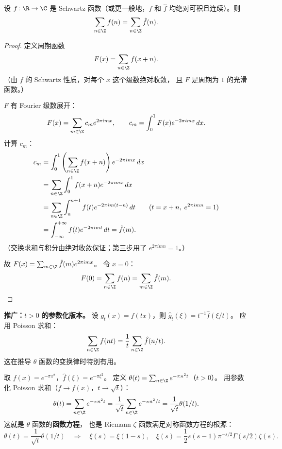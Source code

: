 \begin{theorem}
\label{thm:poisson-summation}
设 $f\colon \R \to \C$ 是 Schwartz 函数（或更一般地，$f$ 和 $\hat{f}$ 均绝对可积且连续）。则
\[
  \sum_{n \in \Z} f(n) = \sum_{n \in \Z} \hat{f}(n).
\]
\end{theorem}



\begin{proof}
定义周期函数
\[
  F(x) = \sum_{n \in \Z} f(x + n).
\]
（由 $f$ 的 Schwartz 性质，对每个 $x$ 这个级数绝对收敛，
且 $F$ 是周期为 $1$ 的光滑函数。）

$F$ 有 Fourier 级数展开：
\[
  F(x) = \sum_{m \in \Z} c_m e^{2\pi i mx},
  \qquad c_m = \int_0^1 F(x) e^{-2\pi imx}\, dx.
\]
计算 $c_m$：
\begin{align}
  c_m
  &= \int_0^1 \left(\sum_{n \in \Z} f(x+n)\right) e^{-2\pi imx}\, dx \\
  &= \sum_{n \in \Z} \int_0^1 f(x+n) e^{-2\pi imx}\, dx \\
  &= \sum_{n \in \Z} \int_n^{n+1} f(t) e^{-2\pi im(t-n)}\, dt
    \qquad (t = x + n,\; e^{2\pi imn} = 1) \\
  &= \int_{-\infty}^{+\infty} f(t) e^{-2\pi imt}\, dt = \hat{f}(m).
\end{align}
（交换求和与积分由绝对收敛保证；第三步用了 $e^{2\pi imn} = 1$。）

故 $F(x) = \sum_{m \in \Z} \hat{f}(m) e^{2\pi imx}$。
令 $x = 0$：
\[
  F(0) = \sum_{n \in \Z} f(n) = \sum_{m \in \Z} \hat{f}(m). \qedhere
\]
\end{proof}

\textbf{推广：$t > 0$ 的参数化版本。}
设 $g_t(x) = f(tx)$，则 $\hat{g}_t(\xi) = t^{-1}\hat{f}(\xi/t)$。
应用 Poisson 求和：
\[
  \sum_{n \in \Z} f(nt) = \frac{1}{t} \sum_{n \in \Z} \hat{f}(n/t).
\]
这在推导 $\theta$ 函数的变换律时特别有用。

\begin{example}
\label{ex:theta-poisson}
取 $f(x) = e^{-\pi x^2}$，$\hat{f}(\xi) = e^{-\pi\xi^2}$。
定义 $\theta(t) = \sum_{n \in \Z} e^{-\pi n^2 t}$（$t > 0$）。
用参数化 Poisson 求和（$f \to f(x)$，$t \to \sqrt{t}$）：
\[
  \theta(t) = \sum_{n \in \Z} e^{-\pi n^2 t}
  = \frac{1}{\sqrt{t}} \sum_{n \in \Z} e^{-\pi n^2/t}
  = \frac{1}{\sqrt{t}} \theta(1/t).
\]
这就是 $\theta$ 函数的\textbf{函数方程}，
也是 Riemann $\zeta$ 函数满足对称函数方程的根源：
\[
  \theta(t) = \frac{1}{\sqrt{t}} \theta(1/t)
  \quad \Longrightarrow \quad
  \xi(s) = \xi(1-s),
  \quad \xi(s) = \frac{1}{2}s(s-1)\pi^{-s/2}\Gamma(s/2)\zeta(s).
\]
\end{example}

